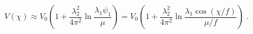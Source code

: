 \begin{equation}
\label{eq:yukawa-tilt}
V(\chi) \approx V_0 \left(1 + \frac{\lambda_2^2}{4\pi^2} \ln
\frac{\lambda_1 \psi_1}{\mu} \right)
=V_0 \left(1 + \frac{\lambda_2^2}{4\pi^2} \ln
\frac{\lambda_1 \cos(\chi/f)}{\mu/f} \right) \;.
\end{equation}

